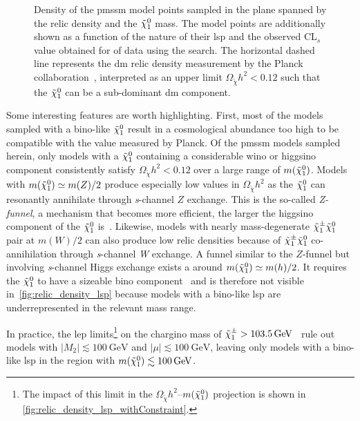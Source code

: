 \begin{figure}
\begin{subfigure}[b]{0.55\linewidth}
		\caption{\label{fig:relic_density_lsp_cls}}
	\end{subfigure}\hfill
	\caption{Density of the \gls{pmssm} model points sampled in the plane spanned by the relic density and the $\tilde{\chi}_1^0$ mass. The model points are additionally shown as a function of  the nature of their \gls{lsp} and  the observed CL$_s$ value obtained for \onethirtynineifb of data using the \onelepton search. The horizontal dashed line represents the \gls{dm} relic density measurement by the Planck collaboration~\cite{Planck}, interpreted as an upper limit $\Omega_{\tilde{\chi}} h^2 < 0.12$ such that the $\tilde{\chi}_1^0$ can be a sub-dominant \gls{dm} component.}
	\label{fig:relic_density}
\end{figure}


Some interesting features are worth highlighting. First, most of the models sampled with a bino-like $\tilde{\chi}_1^0$ result in a cosmological abundance too high to be compatible with the value measured by Planck.
Of the \gls{pmssm} models sampled herein, only models with a $\tilde{\chi}_1^0$ containing a considerable wino or higgsino component consistently satisfy $\Omega_{\tilde{\chi}} h^2 < 0.12$ over a large range of $m(\tilde{\chi}_1^0)$.
Models with $m(\tilde{\chi}_1^0) \simeq m(Z)/2$ produce especially low values in $\Omega_{\tilde{\chi}} h^2$ as the $\tilde{\chi}_1^0$ can resonantly annihilate through \textit{s}-channel $Z$ exchange. This is the so-called \textit{Z-funnel}, a mechanism that becomes more efficient, the larger the higgsino component of the $\tilde{\chi}_1^0$ is~\cite{Cabrera:2016wwr}.
Likewise, models with nearly mass-degenerate $\tilde{\chi}_1^\pm\tilde{\chi}_1^0$ pair at $m(W)/2$ can also produce low relic densities because of $\tilde{\chi}_1^\pm\tilde{\chi}_1^0$ co-annihilation through \textit{s}-channel \textit{W} exchange.
A funnel similar to the $Z$-funnel but involving \textit{s}-channel Higgs exchange exists a around $m(\tilde{\chi}_1^0) \simeq m(h)/2$. It requires the $\tilde{\chi}_1^0$ to have a sizeable bino component~\cite{Cabrera:2016wwr} and is therefore not visible in~\cref{fig:relic_density_lsp} because models with a bino-like \gls{lsp} are underrepresented in the relevant mass range.

In practice, the \gls{lep} limits\footnote{The impact of this limit in the $\Omega_{\tilde{\chi}} h^2$--$m(\tilde{\chi}_1^0)$ projection is shown in \cref{fig:relic_density_lsp_withConstraint}.} on the chargino mass of $\charg > \SI{103.5}{\GeV}$~\cite{lep_susy_results} rule out models with $\vert M_2 \vert \lesssim \SI{100}{\GeV}$ and $\vert \mu \vert \lesssim \SI{100}{\GeV}$, leaving only models with a bino-like \gls{lsp} in the region with $m(\lsp)\lesssim \SI{100}{\GeV}$.

